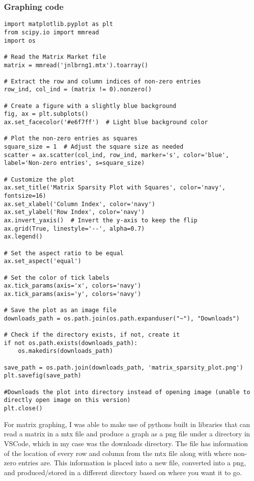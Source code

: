\documentclass[12pt]{article}
\begin{document}
\subsubsection{Graphing code}
\begin{lstlisting}
import matplotlib.pyplot as plt
from scipy.io import mmread
import os

# Read the Matrix Market file
matrix = mmread('jnlbrng1.mtx').toarray()

# Extract the row and column indices of non-zero entries
row_ind, col_ind = (matrix != 0).nonzero()

# Create a figure with a slightly blue background
fig, ax = plt.subplots()
ax.set_facecolor('#e6f7ff')  # Light blue background color

# Plot the non-zero entries as squares
square_size = 1  # Adjust the square size as needed
scatter = ax.scatter(col_ind, row_ind, marker='s', color='blue', label='Non-zero entries', s=square_size)

# Customize the plot
ax.set_title('Matrix Sparsity Plot with Squares', color='navy', fontsize=16)
ax.set_xlabel('Column Index', color='navy')
ax.set_ylabel('Row Index', color='navy')
ax.invert_yaxis()  # Invert the y-axis to keep the flip
ax.grid(True, linestyle='--', alpha=0.7)
ax.legend()

# Set the aspect ratio to be equal
ax.set_aspect('equal')

# Set the color of tick labels
ax.tick_params(axis='x', colors='navy')
ax.tick_params(axis='y', colors='navy')

# Save the plot as an image file
downloads_path = os.path.join(os.path.expanduser("~"), "Downloads")

# Check if the directory exists, if not, create it
if not os.path.exists(downloads_path):
    os.makedirs(downloads_path)

save_path = os.path.join(downloads_path, 'matrix_sparsity_plot.png')
plt.savefig(save_path)

#Downloads the plot into directory instead of opening image (unable to directly open image on this version)
plt.close()
\end{lstlisting}

For matrix graphing, I was able to make use of pythons built in libraries that can read a matrix in a mtx file and produce a graph as a png file under a directory in VSCode, which in my case was the downloads directory. The file has information of the location of every row and column from the mtx file along with where non-zero entries are. This information is placed into a new file, converted into a png, and produced/stored in a different directory based on where you want it to go.
\end{document}
